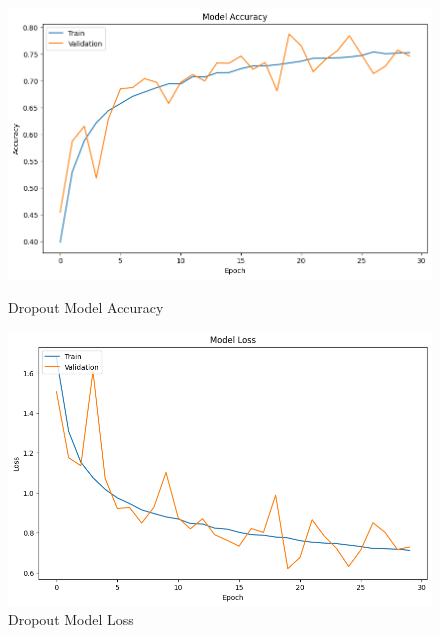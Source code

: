 \documentclass{article}
\begin{document}
\begin{enumerate}
        \begin{figure}[H]
        \centering
        \begin{minipage}{0.45\textwidth}
            \centering
            \includegraphics[width=\textwidth]{DropoutMA.png}
            \caption{Dropout Model Accuracy}
            \label{DOMA}
        \end{minipage}
        \hfill
        \begin{minipage}{0.45\textwidth}
            \centering
            \includegraphics[width=\textwidth]{DropoutML.png}
            \caption{Dropout Model Loss}
            \label{DOML}
        \end{minipage}
    \end{figure}
    
\end{enumerate}
\end{document}
